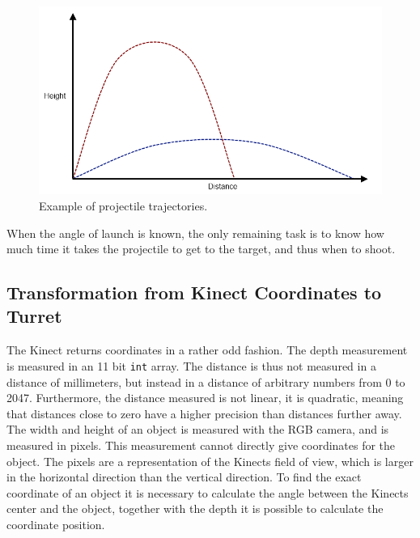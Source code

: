 \begin{figure}[hbtp]
\includegraphics[width=\textwidth]{img/projectile-trajectory-graph.png}
\caption{Example of projectile trajectories.} 
\label{fig:projectile-trajectory} 
\end{figure}

When the angle of launch is known, the only remaining task is to know how much time it takes the projectile to get to the target, and thus when to shoot.

\subsection{Transformation from Kinect Coordinates to Turret}
The Kinect returns coordinates in a rather odd fashion. The depth measurement is measured in an 11 bit \texttt{int} array\cite{kinectdistance}. The distance is thus not measured in a distance of millimeters, but instead in a distance of arbitrary numbers from 0 to 2047. Furthermore, the distance measured is not linear, it is quadratic, meaning that distances close to zero have a higher precision than distances further away.
The width and height of an object is measured with the RGB camera, and is measured in pixels. This measurement cannot directly give coordinates for the object. The pixels are a representation of the Kinects field of  view, which is larger in the horizontal direction than the vertical direction. To find the exact coordinate of an object it is necessary to calculate the angle between the Kinects center and the object, together with the depth it is possible to calculate the coordinate position.